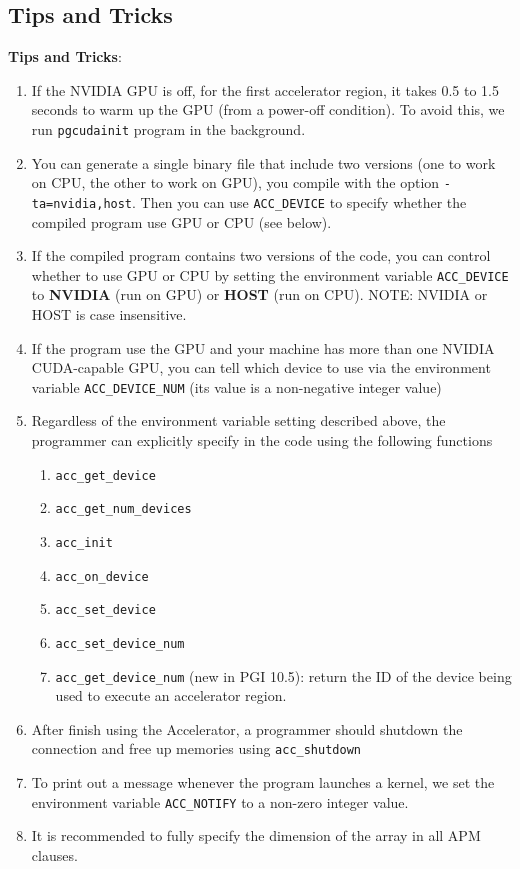 \subsection{Tips and Tricks}
\label{sec:tips-tricks}

{\bf Tips and Tricks}:
\begin{enumerate}
\item If the NVIDIA GPU is off, for the first accelerator region, it
  takes 0.5 to 1.5 seconds to warm up the GPU (from a power-off
  condition). To avoid this, we run \verb.pgcudainit. program in the
  background.
\item You can generate a single binary file that include two versions
  (one to work on CPU, the other to work on GPU), you compile with the
  option \verb!-ta=nvidia,host!. Then you can use \verb.ACC_DEVICE. to
  specify whether the compiled program use GPU or CPU (see below).
\item If the compiled program contains two versions of the code, you
  can control whether to use GPU or CPU by setting the environment
  variable \verb.ACC_DEVICE. to {\bf NVIDIA} (run on GPU) or
  {\bf HOST} (run on CPU). NOTE: NVIDIA or HOST is case insensitive.
\item If the program use the GPU and your machine has more than one
  NVIDIA CUDA-capable GPU, you can tell which device to use via the
  environment variable \verb!ACC_DEVICE_NUM! (its value is a
  non-negative integer value)
\item Regardless of the environment variable setting described above,
  the programmer can explicitly specify in the code using the
  following functions
  \begin{enumerate}
  \item \verb!acc_get_device! 
  \item \verb!acc_get_num_devices!
  \item \verb!acc_init!
  \item \verb!acc_on_device!
  \item \verb!acc_set_device!
  \item \verb!acc_set_device_num!
  \item \verb!acc_get_device_num! (new in PGI 10.5): return the ID of
    the device being used to execute an accelerator region. 
  \end{enumerate}
\item After finish using the Accelerator, a programmer should shutdown
  the connection and free up memories using \verb!acc_shutdown!
\item To print out a message whenever the program launches a kernel,
  we set the environment variable \verb.ACC_NOTIFY. to a non-zero
  integer value.
\item It is recommended to fully specify the dimension of the array in
  all APM clauses. 
\end{enumerate}


